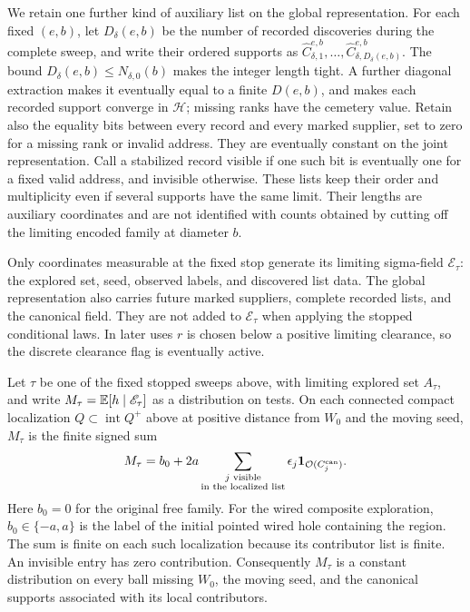 We retain one further kind of auxiliary list on the global
representation. For each fixed \((e,b)\), let \(D_\delta(e,b)\) be
the number of recorded discoveries during the complete sweep, and
write their ordered supports as
\(\widehat C_{\delta,1}^{e,b},\ldots,
\widehat C_{\delta,D_\delta(e,b)}^{e,b}\).
The bound \(D_\delta(e,b)\leq N_{\delta,0}(b)\) makes the integer
length tight. A further diagonal extraction makes it eventually
equal to a finite \(D(e,b)\), and makes each recorded support converge
in \(\mathscr H\); missing ranks have the cemetery value. Retain also
the equality bits between every record and every marked supplier,
set to zero for a missing rank or invalid address.
They are eventually constant on the joint representation.
Call a stabilized record visible if one such bit is eventually one
for a fixed valid address, and invisible otherwise. These lists keep
their order and multiplicity even if several supports have the same
limit. Their lengths are auxiliary coordinates and are not identified
with counts obtained by cutting off the limiting encoded family at
diameter \(b\).

Only coordinates measurable at the fixed stop generate its limiting
sigma-field \(\mathscr E_\tau\): the explored set, seed, observed labels,
and discovered list data. The global representation also carries
future marked suppliers, complete recorded lists, and the canonical
field. They are not added to \(\mathscr E_\tau\) when applying the
stopped conditional laws. In later uses \(r\) is chosen below a
positive limiting clearance, so the discrete clearance flag is
eventually active.

\begin{proposition}
\label{prop:discovered-mean}
Let \(\tau\) be one of the fixed stopped sweeps above, with limiting
explored set \(A_\tau\), and write
\(M_\tau=\mathbb E[h\mid\mathscr E_\tau]\) as a distribution on tests.
On each connected compact localization \(Q\subset\operatorname{int}Q^+\)
above at positive distance from \(W_0\) and the moving seed,
\(M_\tau\) is the finite signed sum
\begin{equation}
 M_\tau=b_0+2a\sum_{\substack{j\text{ visible}\\
                       \text{in the localized list}}}
       \epsilon_j\mathbf 1_{\mathcal O(C_j^{\rm can})}.
 \label{eq:canonical-discovered-mean}
\end{equation}
Here \(b_0=0\) for the original free family. For the wired composite
exploration, \(b_0\in\{-a,a\}\) is the label of the initial pointed
wired hole containing the region. The sum is finite on each such
localization because its contributor list is finite. An invisible
entry has zero contribution. Consequently \(M_\tau\) is a constant
distribution on every ball missing \(W_0\), the moving seed, and the
canonical supports associated with its local contributors.
\end{proposition}

